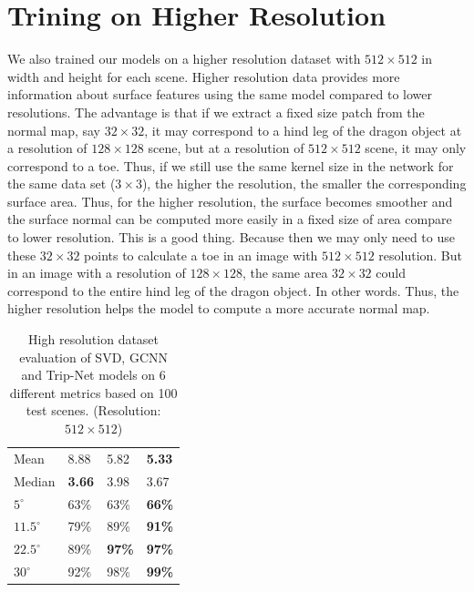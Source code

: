 \section{Trining on Higher Resolution}
We also trained our models on a higher resolution dataset with $ 512 \times 512 $ in width and height for each scene. Higher resolution data provides more information about surface features using the same model compared to lower resolutions. The advantage is that if we extract a fixed size patch from the normal map, say $32\times32$, it may correspond to a hind leg of the dragon object at a resolution of $128 \times 128$ scene, but at a resolution of $512\times 512$ scene, it may only correspond to a toe. Thus, if we still use the same kernel size in the network for the same data set ($ 3\times 3 $), the higher the resolution, the smaller the corresponding surface area. 
Thus, for the higher resolution, the surface becomes smoother and the surface normal can be computed more easily in a fixed size of area compare to lower resolution. This is a good thing. Because then we may only need to use these $ 32\times 32 $ points to calculate a toe in an image with $ 512\times512 $ resolution. But in an image with a resolution of $ 128\times128 $, the same area $ 32\times32 $ could correspond to the entire hind leg of the dragon object. In other words. Thus, the higher resolution helps the model to compute a more accurate normal map. 


\begin{table}[H]
	\centering
	\captionsetup{width=\linewidth}
	\begin{tabular}{l | l l l }
		\toprule
		\tabhead{Metrics} & \tabhead{SVD} & \tabhead{GCNN} & \tabhead{Trip-Net} \\
		\midrule
		Mean  					& 8.88 & 5.82 & \textbf{5.33} \\ 
		\hline
		Median					& \textbf{3.66} & 3.98 & 3.67 \\ 
		\hline
		$ 5^\circ $ 			& 63\% & 63\% & \textbf{66\%} \\
		\hline
		$ 11.5^\circ $ 			& 79\% & 89\% & \textbf{91\%} \\
		\hline
		$ 22.5^\circ $ 			& 89\% & \textbf{97\%} & \textbf{97\%} \\
		\hline
		$ 30^\circ $ 			& 92\% & 98\% & \textbf{99\%} \\
		\bottomrule
	\end{tabular}
	\caption{High resolution dataset evaluation of SVD, GCNN and Trip-Net models on 6 different metrics based on 100 test scenes. (Resolution: $ 512\times512 $)}	
	\label{tab:high_resolution_eval}
\end{table}

